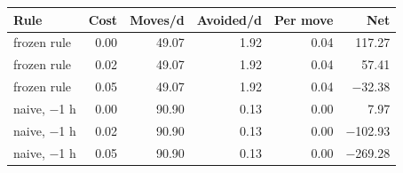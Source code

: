 \begin{tabular}{lrrrrr}
\toprule
Rule & Cost & Moves/d & Avoided/d & Per move & Net \\
\midrule
frozen rule & 0.00 & 49.07 & 1.92 & 0.04 & 117.27 \\
frozen rule & 0.02 & 49.07 & 1.92 & 0.04 & 57.41 \\
frozen rule & 0.05 & 49.07 & 1.92 & 0.04 & $-$32.38 \\
naive, $-$1 h & 0.00 & 90.90 & 0.13 & 0.00 & 7.97 \\
naive, $-$1 h & 0.02 & 90.90 & 0.13 & 0.00 & $-$102.93 \\
naive, $-$1 h & 0.05 & 90.90 & 0.13 & 0.00 & $-$269.28 \\
\bottomrule
\end{tabular}
